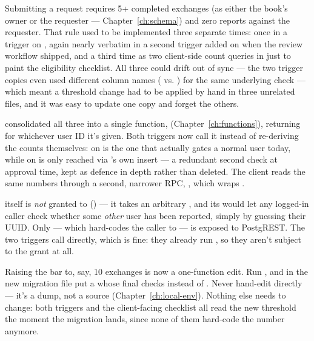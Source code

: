 Submitting a request requires 5+ completed exchanges (as either the book's owner or the requester — Chapter~\ref{ch:schema}) and zero reports against the requester. That rule used to be implemented three separate times: once in a  trigger on , again nearly verbatim in a second trigger added on  when the review workflow shipped, and a third time as two client-side count queries in  just to paint the eligibility checklist. All three could drift out of sync — the two trigger copies even used different column names ( vs. ) for the same underlying check — which meant a threshold change had to be applied by hand in three unrelated files, and it was easy to update one copy and forget the others.

 consolidated all three into a single function,  (Chapter~\ref{ch:functions}), returning  for whichever user ID it's given. Both triggers now call it instead of re-deriving the counts themselves:  on  is the one that actually gates a normal user today, while  on  is only reached via 's own insert — a redundant second check at approval time, kept as defence in depth rather than deleted. The client reads the same numbers through a second, narrower RPC, , which wraps .

\begin{olknote}
 itself is \emph{not} granted to  () — it takes an arbitrary , and its  would let any logged-in caller check whether some \emph{other} user has been reported, simply by guessing their UUID. Only  — which hard-codes the caller to  — is exposed to PostgREST. The two triggers call  directly, which is fine: they already run , so they aren't subject to the grant at all.
\end{olknote}

\begin{olkhowto}
Raising the bar to, say, 10 exchanges is now a one-function edit. Run , and in the new migration file put a  whose final  checks  instead of . Never hand-edit  directly — it's a dump, not a source (Chapter~\ref{ch:local-env}). Nothing else needs to change: both triggers and the client-facing checklist all read the new threshold the moment the migration lands, since none of them hard-code the number anymore.
\end{olkhowto}

